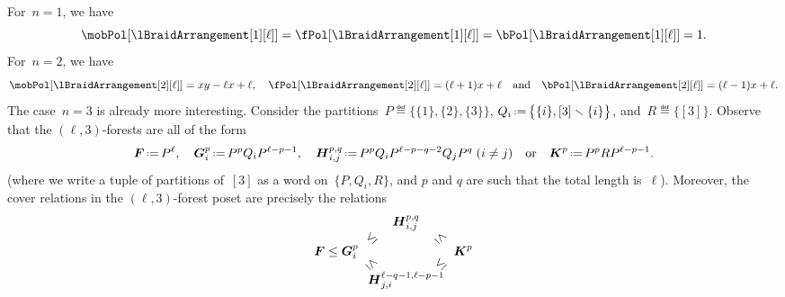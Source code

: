 \begin{example}
For~$n = 1$, we have
\[
\mobPol[{\lBraidArrangement[1][\ell]}] = \fPol[{\lBraidArrangement[1][\ell]}] = \bPol[{\lBraidArrangement[1][\ell]}] = 1.
\]
For~$n = 2$, we have
\[
\mobPol[{\lBraidArrangement[2][\ell]}] = xy-\ell x+\ell,
\quad
\fPol[{\lBraidArrangement[2][\ell]}] = (\ell+1)x+\ell
\quad\text{and}\quad
\bPol[{\lBraidArrangement[2][\ell]}] = (\ell-1)x+\ell.
\]
The case~$n = 3$ is already more interesting.
Consider the partitions~$P \eqdef \big\{ \{1\}, \{2\}, \{3\} \big\}$, $Q_i \eqdef \big\{ \{i\}, [3] \ssm \{i\} \big\}$, and~$R \eqdef \big\{ [3] \big\}$.
Observe that the $(\ell,3)$-forests are all of the form
\begin{gather*}
\b{F} \eqdef P^\ell,
\quad
\b{G}_i^p \eqdef P^p Q_i P^{\ell-p-1}, %
\quad
\b{H}_{i,j}^{p,q} \eqdef P^p Q_i P^{\ell-p-q-2} Q_j P^q \;\text{($i \ne j$)} %
\quad\text{or}\quad
\b{K}^p \eqdef P^p R P^{\ell-p-1}. %
\end{gather*}
(where we write a tuple of partitions of~$[3]$ as a word on~$\{P, Q_i, R\}$, and $p$ and $q$ are such that the total length is~$\ell$).
Moreover, the cover relations in the $(\ell,3)$-forest poset are precisely the relations
\[
\b{F} \le \b{G}_i^p \begin{array}{c@{\hspace{-.3cm}}c@{\hspace{-.3cm}}c} & \b{H}_{i,j}^{p,q} & \\ \rotatebox[origin=c]{45}{$\le$} & & \rotatebox[origin=c]{-45}{$\le$} \\[.3cm] \rotatebox[origin=c]{-45}{$\le$} & & \rotatebox[origin=c]{45}{$\le$} \\ & \b{H}_{j,i}^{\ell-q-1, \ell-p-1} & \end{array} \b{K}^p
\]
\end{example}
